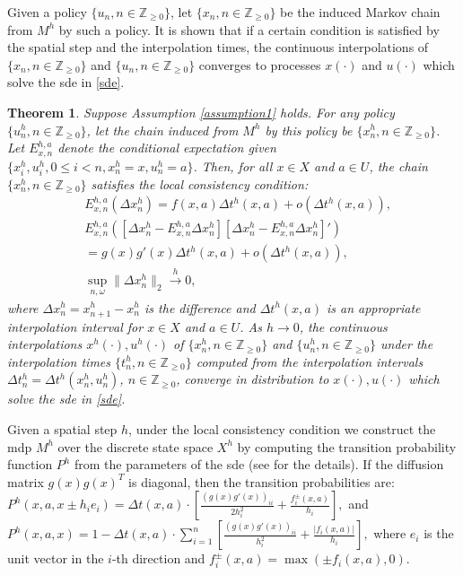 \documentclass[letterpaper, 10 pt, conference]{ieeeconf}
\newtheorem{theorem}{Theorem}
\newcommand{\bbZ}{\mathbb{Z}_{\ge 0}}
\providecommand{\abs}[1]{\left|#1\right|}
\providecommand{\norm}[1]{\lVert#1\rVert}
\begin{document}
Given a policy $\{u_n, n \in \bbZ\}$, let $\{x_n, n\in \bbZ\}$ be the
induced Markov chain from $M^h$ by such a policy.  It is shown that if
a certain condition is satisfied by the spatial step and the
interpolation times, the continuous interpolations of
$\{x_n, n\in \bbZ\}$ and $\{u_n, n \in \bbZ\}$ converges to processes
$x(\cdot)$ and $u(\cdot)$ which solve the \ac{sde} in \eqref{sde}.




\begin{theorem}
\label{thm:stateconverge}
\cite{kushner2001numerical} Suppose Assumption \ref{assumption1}
holds.  For any policy $\{u_n^h, n \in \bbZ\}$, let the chain induced from
$M^h$ by this policy be $\{x^h_n, n \in \bbZ\}$.  Let $E_{x,n}^{h,a}$
denote the conditional expectation given
$\{x^h_i, u^h_i, 0 \le i<n, x^h_n=x,u^h_n=a \}$. Then, for all
$x\in X$ and $a\in U$, the chain $\{x^h_n, n \in \bbZ\}$ satisfies the
\emph{local consistency condition}:
\begin{align*}
& E_{x,n}^{h,a}(\Delta x^h_n )= f(x,a) \Delta t^h(x,a ) + o(\Delta t^h(x,a)),\\
& E_{x,n}^{h,a} \left(\left[\Delta x^h_n -  E_{x,n}^{h,a}\Delta x^h_n
\right]\left[\Delta x^h_n -  E_{x,n}^{h,a}\Delta x^h_n
\right]'\right)\\
&= g(x) g'(x)\Delta t^h(x,a)+o(\Delta t^h(x,a)),\\
& \sup_{n,\omega}\norm{\Delta x_n^h } _2 \xrightarrow{h} 0,
\end{align*}  
where $\Delta x^h_n = x_{n+1}^h- x_n^h$ is the difference and
$\Delta t^h(x,a)$ is an appropriate interpolation interval for
$x\in X$ and $a\in U$.  As $h\rightarrow 0$, the continuous
interpolations $x^h(\cdot), u^h(\cdot)$ of $\{x^h_n, n \in \bbZ \}$
and $\{u_n^h, n \in \bbZ\}$ under the interpolation times
$\{ t_n^h, n \in \bbZ \}$ computed from the interpolation intervals
$\Delta t_n^h= \Delta t^h(x_n^h ,u_n^h)$, $n \in \bbZ$, converge in distribution to
$x(\cdot), u(\cdot)$ which solve the \ac{sde} in
\eqref{sde}.\end{theorem}





Given a spatial step $h$, under the local consistency condition we
construct the \ac{mdp} $M^h$ over the discrete state space $X^h$ by
computing the transition probability function $P^h$ from the
parameters of the \ac{sde} (see \cite{kushner2001numerical} for the
details). If the diffusion matrix $g(x)g(x)^T$ is diagonal, then the
transition probabilities are:
$ P^h(x,a, x\pm h_ie_i)= \Delta t(x,a) \cdot \left[\frac{
    (g(x)g'(x))_{ii}}{2h_i^2}+\frac{ f_i^{\pm}(x,a)}{h_i}\right], $
and
$ P^h(x,a,x) = 1- \Delta t(x,a) \cdot \sum_{i=1}^n\left[\frac{
    (g(x)g'(x))_{ii}}{h_i^2}+\frac{ \abs{f_i(x,a)}}{h_i}\right], $
where $e_i$ is the unit vector in the $i$-th direction and
$f_i^{\pm}(x,a)=\max(\pm f_i(x,a),0)$.
\end{document}
